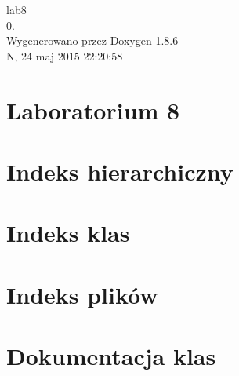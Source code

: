 \documentclass[twoside]{book}
\newcommand{\clearemptydoublepage}{%
  \newpage{\pagestyle{empty}\cleardoublepage}%
}
\begin{document}
\hypersetup{pageanchor=false}
\begin{titlepage}
\vspace*{7cm}
\begin{center}%
{\Large lab8 \\[1ex]\large 0. }\\
\vspace*{1cm}
{\large Wygenerowano przez Doxygen 1.8.6}\\
\vspace*{0.5cm}
{\small N, 24 maj 2015 22:20:58}\\
\end{center}
\end{titlepage}
\clearemptydoublepage
\tableofcontents
\clearemptydoublepage
{}
\hypersetup{pageanchor=true}

\chapter{Laboratorium 8}
\label{index}\hypertarget{index}{}
\chapter{Indeks hierarchiczny}

\chapter{Indeks klas}

\chapter{Indeks plików}

\chapter{Dokumentacja klas}























\end{document}
